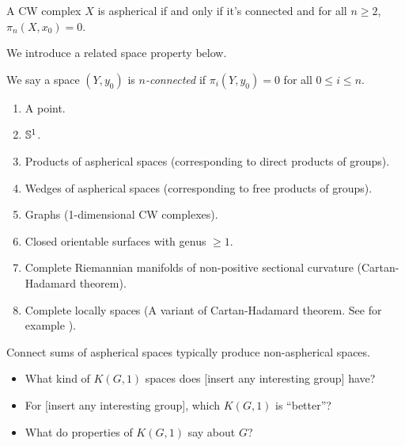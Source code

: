 \begin{theorem}
    \label{thm:aspherical-criterion-trivial-homotopy-group}
    A CW complex \(X\) is aspherical if and only if it's connected and for all \(n\geq 2\), \(\pi_n(X,x_0)=0\).
\end{theorem}

We introduce a related space property below.

\begin{definition}
    \label{def:n-connected}
    We say a space \((Y,y_0)\) is \emph{\(n\)-connected} if \(\pi_i(Y,y_0) =0\) for all \(0\leq i \leq n\).
\end{definition}


\begin{example}
    \label{ex:aspherical-spaces}
    \hfill \break
    \begin{enumerate}
        \item A point.
        \item \(\mathbb S^1\).
        \item Products of aspherical spaces (corresponding to direct products of groups).
        \item Wedges of aspherical spaces (corresponding to free products of groups).
        \item Graphs (1-dimensional CW complexes).
        \item Closed orientable surfaces with genus \(\geq 1\).
        \item Complete Riemannian manifolds of non-positive sectional curvature (Cartan-Hadamard theorem).
        \item Complete locally \CATz spaces (A variant of Cartan-Hadamard theorem. See for example \cite[Theorem II.4.1]{bridsonMetricSpacesNonpositive1999}).
    \end{enumerate}
\end{example}

\begin{example}
    Connect sums of aspherical spaces typically produce non-aspherical spaces.
\end{example}

\begin{question}
\begin{itemize}
    \item What kind of \(K(G,1)\) spaces does [insert any interesting group] have?
    \item For [insert any interesting group], which \(K(G,1)\) is ``better''?
    \item What do properties of \(K(G,1)\) say about \(G\)?
\end{itemize}
\end{question}

